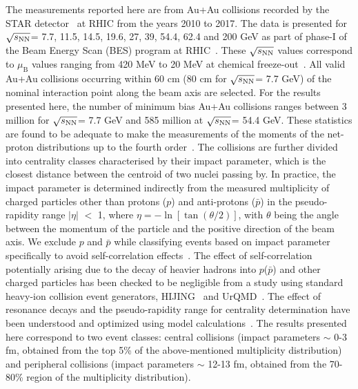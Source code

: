 \documentclass[10pt,aps,prc,twocolumn,floatfix]{revtex4-1}
\newcommand{\rootsnn} {\mbox{$\sqrt{s_{\rm NN}}$}\xspace}
\begin{document}
The measurements reported here are from Au+Au collisions
recorded by the STAR detector~\cite{Ackermann:2002ad} at RHIC from
the years 2010 to 2017. 
The data is presented for \rootsnn = 7.7, 11.5, 14.5, 19.6, 27, 39, 54.4,
62.4 and 200 GeV as part of phase-I of the Beam Energy Scan (BES)
program at RHIC~\cite{Adamczyk:2017iwn}. These \rootsnn values correspond to
$\mu_{\mathrm B}$ values ranging from 420 MeV to 20 MeV  at chemical
freeze-out~\cite{Adamczyk:2017iwn}. All
valid Au+Au collisions occurring within 60 cm (80 cm for \rootsnn =
7.7 GeV) of
the nominal interaction point along the beam axis are selected.
For the results presented here, the number of minimum bias Au+Au collisions
ranges between 3 million for \rootsnn = 7.7 GeV and
585 million at \rootsnn = 54.4 GeV. 
These statistics are
found to be adequate to make the measurements of the moments of the net-proton
distributions up to the fourth order~\cite{Pandav:2018bdx}. 
The collisions are further divided into centrality classes characterised by their impact 
parameter, which is the closest distance between the centroid of two
nuclei passing by. In practice, the impact parameter is determined
indirectly from the measured multiplicity
of charged particles other than protons ($p$) and
anti-protons ($\bar{p}$)
in the pseudo-rapidity range $|\eta|$ $<$ 1,
where $\eta=- \ln [ \tan (\theta/2)]$, with $\theta$ being the angle
between the momentum of the particle and the positive direction of the
beam axis. 
We exclude $p$ and $\bar{p}$ while classifying events based on
impact parameter specifically to avoid self-correlation
effects~\cite{Chatterjee:2019fey}.
The effect of self-correlation potentially arising due to the decay of
heavier hadrons into $p$($\bar{p}$) and other charged particles has
been checked to be negligible from a study
using standard heavy-ion
collision event generators, HIJING~\cite{Wang:1991hta} and
UrQMD~\cite{Bleicher:1999xi}.
The effect of resonance decays and 
the pseudo-rapidity range for centrality determination have been understood 
and optimized using model
calculations~\cite{Luo:2013bmi,Garg:2013ata}. 
The results presented
here correspond to two event classes: central
collisions (impact parameters $\sim$ 0-3 fm, obtained from the top 5\%
of the above-mentioned multiplicity distribution) and peripheral
collisions (impact parameters $\sim$ 12-13 fm, obtained from the
70-80\% region of the multiplicity distribution).
\end{document}

